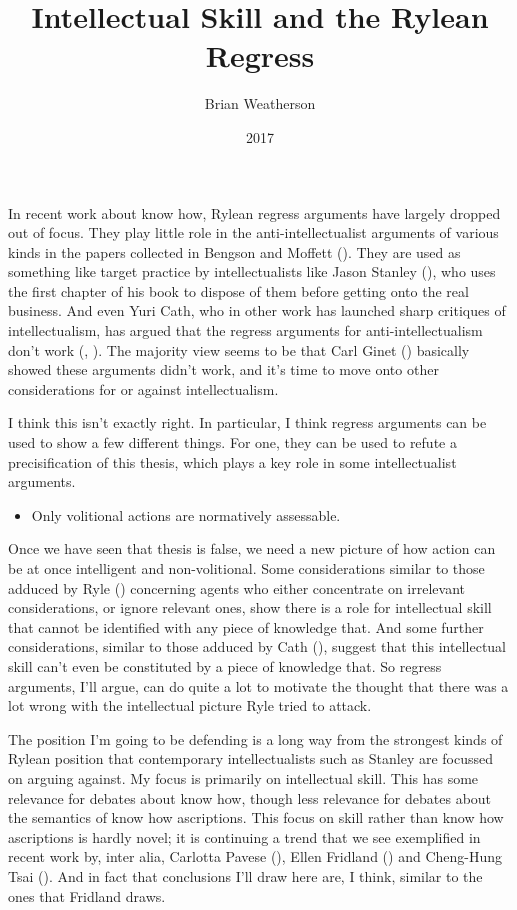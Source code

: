 \documentclass[
  11pt,
  letterpaper,
  DIV=11,
  numbers=noendperiod,
  oneside]{scrartcl}
\title{Intellectual Skill and the Rylean Regress}
\author{Brian Weatherson}
\date{2017}
\providecommand{\tightlist}{%
  \setlength{\itemsep}{0pt}\setlength{\parskip}{0pt}}\usepackage{longtable,booktabs,array}
\begin{document}
\maketitle

In recent work about know how, Rylean regress arguments have largely
dropped out of focus. They play little role in the anti-intellectualist
arguments of various kinds in the papers collected in Bengson and
Moffett (). They are used as
something like target practice by intellectualists like Jason Stanley
(), who uses the first chapter of his
book to dispose of them before getting onto the real business. And even
Yuri Cath, who in other work has launched sharp critiques of
intellectualism, has argued that the regress arguments for
anti-intellectualism don't work (,
). The majority view seems to be that Carl
Ginet () basically showed these arguments
didn't work, and it's time to move onto other considerations for or
against intellectualism.

I think this isn't exactly right. In particular, I think regress
arguments can be used to show a few different things. For one, they can
be used to refute a precisification of this thesis, which plays a key
role in some intellectualist arguments.

\begin{itemize}
\tightlist
\item
  Only volitional actions are normatively assessable.
\end{itemize}

Once we have seen that thesis is false, we need a new picture of how
action can be at once intelligent and non-volitional. Some
considerations similar to those adduced by Ryle
() concerning agents who either concentrate
on irrelevant considerations, or ignore relevant ones, show there is a
role for intellectual skill that cannot be identified with any piece of
knowledge that. And some further considerations, similar to those
adduced by Cath (), suggest that this
intellectual skill can't even be constituted by a piece of knowledge
that. So regress arguments, I'll argue, can do quite a lot to motivate
the thought that there was a lot wrong with the intellectual picture
Ryle tried to attack.

The position I'm going to be defending is a long way from the strongest
kinds of Rylean position that contemporary intellectualists such as
Stanley are focussed on arguing against. My focus is primarily on
intellectual skill. This has some relevance for debates about know how,
though less relevance for debates about the semantics of know how
ascriptions. This focus on skill rather than know how ascriptions is
hardly novel; it is continuing a trend that we see exemplified in recent
work by, inter alia, Carlotta Pavese (),
Ellen Fridland () and Cheng-Hung Tsai
(). And in fact that conclusions I'll draw
here are, I think, similar to the ones that Fridland draws.
\end{document}
